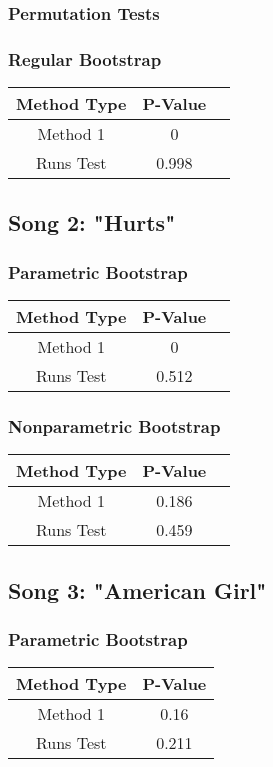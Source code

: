 \documentclass[12pt, letterpaper]{article}
\begin{document}
\subsubsection{Permutation Tests}
\subsubsection{Regular Bootstrap}
\begin{tabular}{|c|c|c|}
\hline
\textbf{Method Type} & P-Value \\
\hline
Method 1 & 0 \\
\hline
Runs Test & 0.998 \\ 
\hline
\end{tabular}

\subsection{Song 2: "Hurts"}

\subsubsection{Parametric Bootstrap}
\begin{tabular}{|c|c|c|}
\hline
\textbf{Method Type} & P-Value \\
\hline
Method 1 & 0  \\
\hline
Runs Test & 0.512 \\ 
\hline
\end{tabular}

\subsubsection{Nonparametric Bootstrap}
\begin{tabular}{|c|c|c|}
\hline
\textbf{Method Type} & P-Value \\
\hline
Method 1 & 0.186  \\
\hline
Runs Test & 0.459 \\ 
\hline
\end{tabular}

\subsection{Song 3: "American Girl"}
\subsubsection{Parametric Bootstrap}

\begin{tabular}{|c|c|}
\hline
\textbf{Method Type} & P-Value \\
\hline
Method 1 & 0.16 \\
\hline
Runs Test & 0.211 \\ 
\hline 
\end{tabular}
\end{document}
